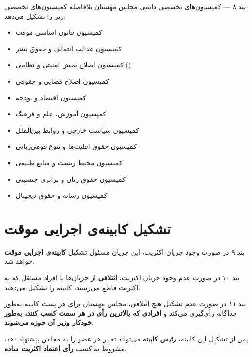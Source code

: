 \documentclass[12pt,a4paper,twoside,openany]{book}
\begin{document}
	\begin{bandbox}{بند ۸ --- کمیسیون‌های تخصصی دائمی}
		مجلس مهستان بلافاصله کمیسیون‌های تخصصی زیر را تشکیل می‌دهد:
		\begin{itemize}
			\item کمیسیون قانون اساسی موقت
			\item کمیسیون عدالت انتقالی و حقوق بشر
			\item کمیسیون اصلاح بخش امنیتی و نظامی ()
			\item کمیسیون اصلاح قضایی و حقوقی
			\item کمیسیون اقتصاد و بودجه
			\item کمیسیون آموزش، علم و فرهنگ
			\item کمیسیون سیاست خارجی و روابط بین‌الملل
			\item کمیسیون حقوق اقلیت‌ها و تنوع قومی‌زبانی
			\item کمیسیون محیط زیست و منابع طبیعی
			\item کمیسیون حقوق زنان و برابری جنسیتی
			\item کمیسیون رسانه و حقوق دیجیتال
		\end{itemize}
	\end{bandbox}
	
	\section{تشکیل کابینه‌ی اجرایی موقت}
	
	\begin{bandbox}{بند ۹}
		در صورت وجود جریان اکثریت، این جریان مسئول تشکیل \textbf{کابینه‌ی اجرایی موقت}
		خواهد شد.
	\end{bandbox}
	
	\begin{bandbox}{بند ۱۰}
		در صورت عدم وجود جریان اکثریت، \textbf{ائتلافی} از جریان‌ها یا افراد مستقل که
		به اکثریت قاطع می‌رسند، کابینه را تشکیل می‌دهند.
	\end{bandbox}
	
	\begin{bandbox}{بند ۱۱}
		در صورت عدم تشکیل هیچ ائتلافی، مجلس مهستان برای هر پست کابینه به‌طور جداگانه
		رأی‌گیری می‌کند و \textbf{افرادی که بالاترین رأی در هر سمت کسب کنند، به‌طور
			خودکار وزیر آن حوزه می‌شوند.}
		
		پس از تشکیل این کابینه، \textbf{رئیس کابینه} می‌تواند تغییر هر عضو را به مجلس
		پیشنهاد دهد، مشروط به کسب \textbf{رأی اعتماد اکثریت ساده.}
	\end{bandbox}
	
\end{document}

